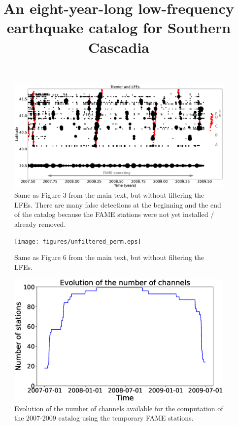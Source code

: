 \documentclass[draft]{agujournal2019}
\begin{document}
\title{An eight-year-long low-frequency earthquake catalog for Southern Cascadia}




\begin{figure}[hbt!]
\noindent\includegraphics[width=\textwidth, trim={0cm 0cm 0cm 0cm},clip]{figures/unfiltered_FAME.eps}
\caption{Same as Figure 3 from the main text, but without filtering the LFEs. There are many false detections at the beginning and the end of the catalog because the FAME stations were not yet installed / already removed.}
\label{pngfiguresample}
\end{figure}

\begin{figure}[hbt!]
\noindent\texttt{[image: figures/unfiltered\_perm.eps]}
\caption{Same as Figure 6 from the main text, but without filtering the LFEs.}
\label{pngfiguresample}
\end{figure}

\begin{figure}[hbt!]
\noindent\includegraphics[width=\textwidth, trim={0cm 0cm 0cm 0cm},clip]{figures/timeline_FAME.eps}
\caption{Evolution of the number of channels available for the computation of the 2007-2009 catalog using the temporary FAME stations.}
\label{pngfiguresample}
\end{figure}
\end{document}
